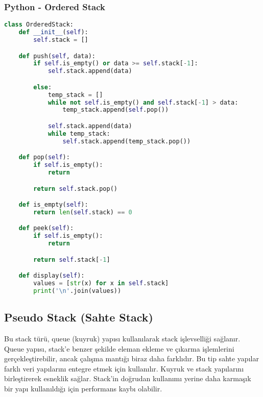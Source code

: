 \subsubsection{Python - Ordered Stack}

\begin{lstlisting}[language=Python]
class OrderedStack:
    def __init__(self):
        self.stack = []

    def push(self, data):
        if self.is_empty() or data >= self.stack[-1]:
            self.stack.append(data)

        else:
            temp_stack = []
            while not self.is_empty() and self.stack[-1] > data:
                temp_stack.append(self.pop())

            self.stack.append(data)
            while temp_stack:
                self.stack.append(temp_stack.pop())

    def pop(self):
        if self.is_empty():
            return

        return self.stack.pop()

    def is_empty(self):
        return len(self.stack) == 0

    def peek(self):
        if self.is_empty():
            return

        return self.stack[-1]

    def display(self):
        values = [str(x) for x in self.stack]
        print('\n'.join(values))
\end{lstlisting}

\newpage

\subsection{Pseudo Stack (Sahte Stack)}

Bu stack türü, queue (kuyruk) yapısı kullanılarak stack işlevselliği sağlanır. Queue yapısı, stack’e benzer şekilde eleman ekleme ve çıkarma işlemlerini gerçekleştirebilir, ancak çalışma mantığı biraz daha farklıdır. Bu tip sahte yapılar farklı veri yapılarını entegre etmek için kullanılır. Kuyruk ve stack yapılarını birleştirerek esneklik sağlar. Stack'in doğrudan kullanımı yerine daha karmaşık bir yapı kullanıldığı için performans kaybı olabilir.

\newpage